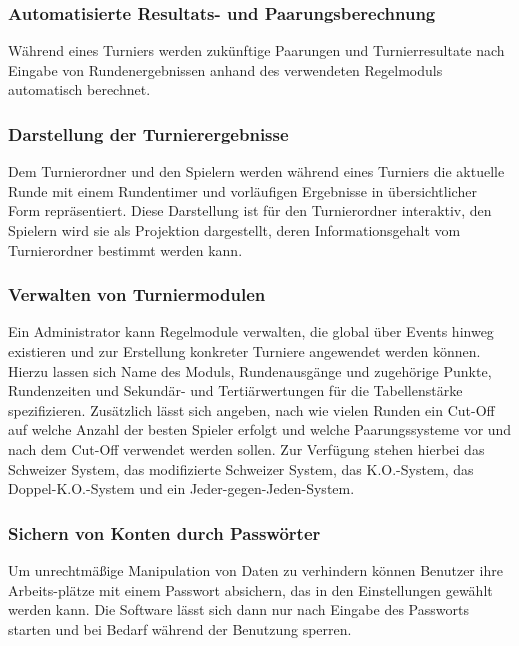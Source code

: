 \documentclass[11pt]{article}
\begin{document}
\subsubsection{Automatisierte Resultats- und Paarungsberechnung}

Während eines Turniers werden zukünftige Paarungen und Turnierresultate nach Eingabe von Rundenergebnissen anhand des verwendeten Regelmoduls automatisch berechnet.

\subsubsection{Darstellung der Turnierergebnisse}

Dem Turnierordner und den Spielern werden während eines Turniers die aktuelle Runde mit einem Rundentimer und vorläufigen Ergebnisse in übersichtlicher Form repräsentiert. Diese Darstellung ist für den Turnierordner interaktiv, den Spielern wird sie als Projektion dargestellt, deren Informationsgehalt vom Turnierordner bestimmt werden kann.

\newpage

\subsubsection{Verwalten von Turniermodulen}

Ein Administrator kann Regelmodule verwalten, die global über Events hinweg existieren und zur Erstellung konkreter Turniere angewendet werden können. Hierzu lassen sich Name des Moduls, Rundenausgänge und zugehörige Punkte, Rundenzeiten und Sekundär- und Tertiärwertungen für die Tabellenstärke spezifizieren. Zusätzlich lässt sich angeben, nach wie vielen Runden ein Cut-Off auf welche Anzahl der besten Spieler erfolgt und welche Paarungssysteme vor und nach dem Cut-Off verwendet werden sollen. Zur Verfügung stehen hierbei das Schweizer System, das modifizierte Schweizer System, das K.O.-System, das Doppel-K.O.-System und ein Jeder-gegen-Jeden-System.

\subsubsection{Sichern von Konten durch Passwörter}

Um unrechtmäßige Manipulation von Daten zu verhindern können Benutzer ihre Arbeits-plätze mit einem Passwort absichern, das in den Einstellungen gewählt werden kann. Die Software lässt sich dann nur nach Eingabe des Passworts starten und bei Bedarf während der Benutzung sperren.
\end{document}
